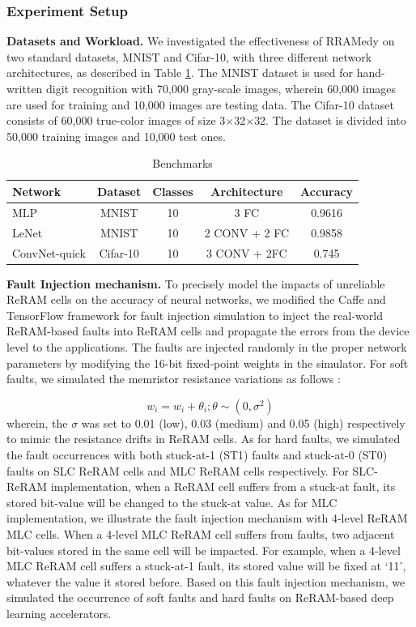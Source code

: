 \subsubsection{Experiment Setup}
{\bf Datasets and Workload.} 
We investigated the effectiveness of RRAMedy on two standard datasets, MNIST and Cifar-10, with three different network architectures, as described in Table \ref{tab:dataset}. The MNIST dataset is used for hand-written digit recognition with 70,000 gray-scale images, wherein 60,000 images are used for training and 10,000 images are testing data. The Cifar-10 dataset consists of 60,000 true-color images of size 3$\times$32$\times$32. The dataset is divided into 50,000 training images and 10,000 test ones. 

\begin{table}[b]
    \centering
    \caption{Benchmarks}
    \label{tab:dataset}
    \begin{tabular}{lcccc}
        \toprule
        Network & Dataset& Classes&Architecture&Accuracy\\
        \midrule
        MLP&MNIST&10&3 FC&0.9616\\
        LeNet&MNIST&10&2 CONV + 2 FC&0.9858\\
        ConvNet-quick&Cifar-10 &10&3 CONV + 2FC&0.745\\
        \bottomrule
    \end{tabular}
\end{table}

{\bf Fault Injection mechanism.} 
To precisely model the impacts of unreliable ReRAM cells on the accuracy of neural networks, we modified the Caffe and TensorFlow framework for fault injection simulation to inject the real-world ReRAM-based faults into ReRAM cells and propagate the errors from the device level to the applications. The faults are injected randomly in the proper network parameters by modifying the 16-bit fixed-point weights in the simulator. For soft faults, we simulated the memristor resistance variations as follows \cite{7926952}:

\begin{equation}
    {w_i} = {w_i}+{{\theta _i}};\theta  \sim (0,{\sigma ^2})
\end{equation}
wherein, the $\sigma$ was set to 0.01 (low), 0.03 (medium) and 0.05 (high) respectively to mimic the resistance drifts in ReRAM cells. 
As for hard faults, we simulated the fault occurrences with both stuck-at-1 (ST1) faults and stuck-at-0 (ST0) faults on SLC ReRAM cells and MLC ReRAM cells respectively. For SLC-ReRAM implementation, when a ReRAM cell suffers from a stuck-at fault, its stored bit-value will be changed to the stuck-at value. As for MLC implementation, we illustrate the fault injection mechanism with 4-level ReRAM MLC cells. When a 4-level MLC ReRAM cell suffers from faults, two adjacent bit-values stored in the same cell will be impacted. For example, when a 4-level MLC ReRAM cell suffers a stuck-at-1 fault, its stored value will be fixed at `11', whatever the value it stored before. Based on this fault injection mechanism, we simulated the occurrence of soft faults and hard faults on ReRAM-based deep learning accelerators.

